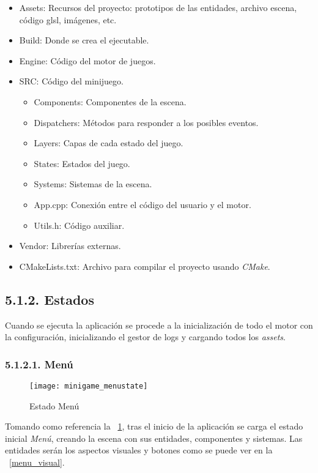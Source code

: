 \begin{itemize}
    \item Assets: Recursos del proyecto: prototipos de las entidades, archivo escena, código \gls{glsl}, imágenes, etc.
    \item Build: Donde se crea el ejecutable.
    \item Engine: Código del motor de juegos.
    \item SRC: Código del minijuego.
    \begin{itemize}
    \item Components: Componentes de la escena.
    \item Dispatchers: Métodos para responder a los posibles eventos.
    \item Layers: Capas de cada estado del juego.
    \item States: Estados del juego.
    \item Systems: Sistemas de la escena.
    \item App.cpp: Conexión entre el código del usuario y el motor.
    \item Utils.h: Código auxiliar.
\end{itemize}
    \item Vendor: Librerías externas.
    \item CMakeLists.txt: Archivo para compilar el proyecto usando \textit{CMake}\cite{cmake}.
\end{itemize}

\subsection*{5.1.2. Estados}\label{sec:minigame_states}

Cuando se ejecuta la aplicación se procede a la inicialización de todo el motor con la configuración,
inicializando el gestor de logs y cargando todos los \textit{assets}.

\subsubsection*{5.1.2.1. Menú}\label{sec:minigame_menustate}
\begin{figure}[h!]
    \centering
    \texttt{[image: minigame\_menustate]}
    \caption{Estado Menú}
    \label{minigame_menustate}
\end{figure}

Tomando como referencia la \figurename~\ref{minigame_menustate}, tras el inicio de la aplicación se carga
el estado inicial \textit{Menú}, creando la escena con sus entidades, componentes y sistemas. Las entidades serán
los aspectos visuales y botones como se puede ver en la \figurename~\ref{menu_visual}.

